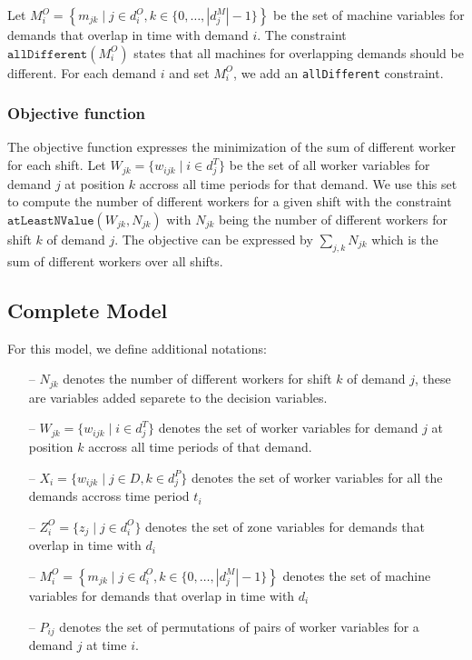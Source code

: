 \documentclass[../../thesis.tex]{subfiles}
\begin{document}
Let $M^O_i = \left\{ m_{jk} \mid j \in d^O_i, k \in \{0, \dots, |d^M_j| - 1 \} \right\}$ be the set of machine variables for demands that overlap in time 
with demand $i$. The constraint $\texttt{allDifferent}(M^O_i)$ states that all machines for overlapping demands 
should be different. For each demand $i$ and set $M^O_i$, we add an \texttt{allDifferent} constraint.

\subsubsection{Objective function}

The objective function expresses the minimization of the sum of different worker for each shift.
Let $W_{jk} = \{ w_{ijk} \mid i \in d^T_j \}$ be the set of all worker variables for demand $j$ at position $k$ accross all time periods for that demand.
We use this set to compute the number of different workers for a given shift with the constraint
$\texttt{atLeastNValue}(W_{jk}, N_{jk})$ with $N_{jk}$ being the number of different workers for shift $k$ of demand $j$.
The objective can be expressed by $\sum_{j, k} N_{jk}$ which is the sum of different workers over all shifts. 


\subsection{Complete Model}

For this model, we define additional notations:

\begin{itemize}
  \item[--] $N_{jk}$ denotes the number of different workers for shift $k$ of demand $j$, these are variables added separete to the decision variables.
  \item[--] $W_{jk} = \{ w_{ijk} \mid i \in d^T_j \}$ denotes the set of worker variables for demand $j$ at position $k$ accross all time periods of that demand.
  \item[--] $X_i = \{w_{ijk} \mid j \in D, k \in d_j^P \}$ denotes the set of worker variables for all the demands accross time period $t_i$
  \item[--] $Z^O_i = \{ z_{j} \mid j \in d^O_i \}$ denotes the set of zone variables for demands that overlap in time with $d_i$
  \item[--] $M^O_i = \left\{ m_{jk} \mid j \in d^O_i, k \in \{0, \dots, |d^M_j| - 1 \} \right\}$ denotes the set of machine variables for demands that overlap in time with $d_i$ 
  \item[--] $P_{ij}$ denotes the set of permutations of pairs of worker variables for a demand $j$ at time $i$.
\end{itemize}
\end{document}
